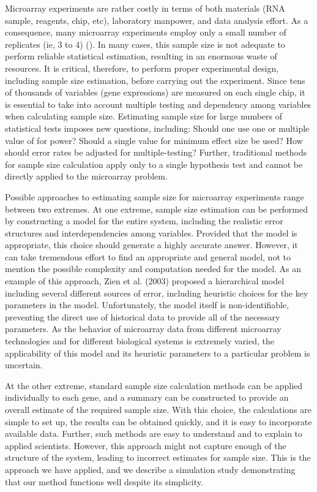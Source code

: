 \documentclass{bioinfo}
\begin{document}
Microarray experiments are rather costly in terms of both
materials (RNA sample, reagents, chip, etc), laboratory manpower,
and data analysis effort.  As a consequence, many microarray
experiments employ only a small number of replicates (ie, 3 to 4)
(\citealp{Mandel03}). In many cases, this sample size is not
adequate to perform reliable statistical estimation, resulting in
an enormous waste of resources. It is critical, therefore, to
perform proper experimental design, including sample size
estimation, before carrying out the experiment. Since tens of
thousands of variables (gene expressions) are measured on each
single chip, it is essential to take into account multiple testing
and dependency among variables when calculating sample size.
Estimating sample size for large numbers of statistical tests
imposes new questions, including: Should one use one or multiple
value of for power? Should a single value for minimum effect size
be used?  How should error rates be adjusted for multiple-testing?
 Further, traditional methods for sample size calculation apply only to a single hypothesis test
and cannot be directly applied to the microarray problem.

Possible approaches to estimating sample size for microarray
experiments range between two extremes. At one extreme, sample
size estimation can be performed by constructing a model for the
entire system, including the realistic error structures and
interdependencies among variables. Provided that the model is
appropriate, this choice should generate a highly accurate answer.
However, it can take tremendous effort to find an appropriate and
general model, not to mention the possible complexity and
computation needed for the model. As an example of this approach,
Zien et al. (2003) proposed a hierarchical model including several
different sources of error, including heuristic choices for the
key parameters in the model. Unfortunately, the model itself is
non-identifiable, preventing the direct use of historical data to
provide all of the necessary parameters.  As the behavior of
microarray data from different microarray technologies and for
different biological systems is extremely varied, the
applicability of this model and its heuristic parameters to a
particular problem is uncertain.

At the other extreme, standard sample size calculation methods can
be applied individually to each gene, and a summary can be
constructed to provide an overall estimate of the required sample
size.  With this choice, the calculations are simple to set up,
the results can be obtained quickly, and it is easy to incorporate
available data. Further, such methods are easy to understand and
to explain to applied scientists.  However, this approach might
not capture enough of the structure of the system, leading to
incorrect estimates for sample size.  This is the approach we have
applied, and we describe a simulation study demonstrating that our
method functions well despite its simplicity.
\end{document}
